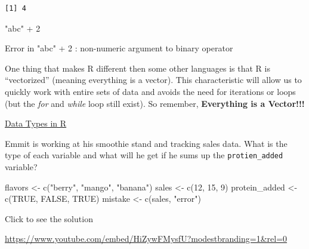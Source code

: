 \documentclass[
  letterpaper,
  DIV=11,
  numbers=noendperiod]{scrreprt}
\newenvironment{Shaded}{\begin{snugshade}}{\end{snugshade}}
\newcommand{\ConstantTok}[1]{\textcolor[rgb]{0.56,0.35,0.01}{#1}}
\newcommand{\DecValTok}[1]{\textcolor[rgb]{0.68,0.00,0.00}{#1}}
\newcommand{\FunctionTok}[1]{\textcolor[rgb]{0.28,0.35,0.67}{#1}}
\newcommand{\NormalTok}[1]{\textcolor[rgb]{0.00,0.23,0.31}{#1}}
\newcommand{\OtherTok}[1]{\textcolor[rgb]{0.00,0.23,0.31}{#1}}
\newcommand{\SpecialCharTok}[1]{\textcolor[rgb]{0.37,0.37,0.37}{#1}}
\newcommand{\StringTok}[1]{\textcolor[rgb]{0.13,0.47,0.30}{#1}}
\begin{document}
\begin{verbatim}
[1] 4
\end{verbatim}

\begin{Shaded}
\begin{Highlighting}[]
\StringTok{"abc"} \SpecialCharTok{+} \DecValTok{2}
\end{Highlighting}
\end{Shaded}

{Error in "abc" + 2 : non-numeric argument to binary operator}

One thing that makes R different then some other languages is that R is
``vectorized'' (meaning everything is a vector). This characteristic
will allow us to quickly work with entire sets of data and avoids the
need for iterations or loops (but the \emph{for} and \emph{while} loop
still exist). So remember, \textbf{Everything is a Vector!!!}

\begin{watch}{}{}
    \href{https://youtu.be/6m-hh-NG0X0}{Data Types in R}
\end{watch}

\begin{tcolorbox}[enhanced jigsaw, colbacktitle=quarto-callout-tip-color!10!white, breakable, bottomrule=.15mm, colframe=quarto-callout-tip-color-frame, left=2mm, opacitybacktitle=0.6, title=\textcolor{quarto-callout-tip-color}{\faLightbulb}\hspace{0.5em}{Try it Out}, leftrule=.75mm, opacityback=0, rightrule=.15mm, titlerule=0mm, bottomtitle=1mm, colback=white, toprule=.15mm, arc=.35mm, toptitle=1mm, coltitle=black]

Emmit is working at his smoothie stand and tracking sales data. What is
the type of each variable and what will he get if he sums up the
\texttt{protien\_added} variable?

\begin{Shaded}
\begin{Highlighting}[]
\NormalTok{flavors }\OtherTok{\textless{}{-}} \FunctionTok{c}\NormalTok{(}\StringTok{"berry"}\NormalTok{, }\StringTok{"mango"}\NormalTok{, }\StringTok{"banana"}\NormalTok{)}
\NormalTok{sales }\OtherTok{\textless{}{-}} \FunctionTok{c}\NormalTok{(}\DecValTok{12}\NormalTok{, }\DecValTok{15}\NormalTok{, }\DecValTok{9}\NormalTok{)}
\NormalTok{protein\_added }\OtherTok{\textless{}{-}} \FunctionTok{c}\NormalTok{(}\ConstantTok{TRUE}\NormalTok{, }\ConstantTok{FALSE}\NormalTok{, }\ConstantTok{TRUE}\NormalTok{)}
\NormalTok{mistake }\OtherTok{\textless{}{-}} \FunctionTok{c}\NormalTok{(sales, }\StringTok{"error"}\NormalTok{)}
\end{Highlighting}
\end{Shaded}

Click to see the solution

\url{https://www.youtube.com/embed/HiZywFMysfU?modestbranding=1&rel=0}

\end{tcolorbox}
\end{document}

